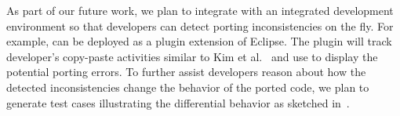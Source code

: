 \documentclass[a4paper, 11pt]{article}
\begin{document}
\begin{small}
As part of our future work, we plan to integrate {\spa} with an integrated development environment so
 that developers can detect porting inconsistencies on the fly. For example, {\spa} can be deployed as a plugin extension of Eclipse. The plugin will track developer's copy-paste activities similar to Kim et al.~\cite{Kim2004} and use {\spa} to display the potential porting errors. To further assist developers reason about how the detected inconsistencies change the behavior of the ported code, we plan to generate test cases illustrating the differential behavior as sketched in~\cite{rayThesis}.

%
%
%




\end{small}
\end{document}
